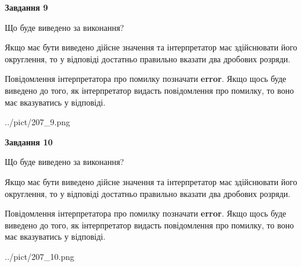 \documentclass[12pt, ukrainian]{article}
\begin{document}
{\begin {Large}
{\begin {center}\textbf{Завдання 9}\end {center}}\par
Що буде виведено за виконання? \par

Якщо має бути виведено дійсне значення та інтерпретатор має здійснювати його округлення, 
то у відповіді достатньо правильно вказати два дробових розряди.

Повідомлення інтерпретатора про помилку позначати \textbf{error}.
Якщо щось буде виведено до того, як інтерпретатор видасть повідомлення про помилку, 
то воно має вказуватись у відповіді. \par

\begin{center}
	{../pict/207_9.png}
\end{center}
\newpage

{\begin {center}\textbf{Завдання 10}\end {center}}\par
Що буде виведено за виконання? \par

Якщо має бути виведено дійсне значення та інтерпретатор має здійснювати його округлення, 
то у відповіді достатньо правильно вказати два дробових розряди.

Повідомлення інтерпретатора про помилку позначати \textbf{error}.
Якщо щось буде виведено до того, як інтерпретатор видасть повідомлення про помилку, 
то воно має вказуватись у відповіді. \par

\begin{center}
	{../pict/207_10.png}
\end{center}
\newpage

\end {Large}}
\end{document}
